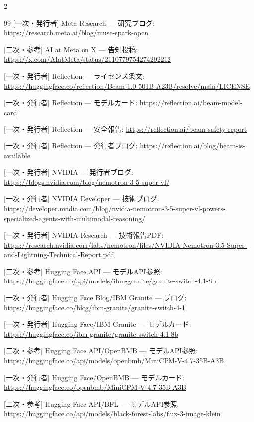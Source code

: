 \documentclass[lualatex,a4paper,10pt]{jlreq}
\begin{document}
\begin{multicols}{2}
\begin{thebibliography}{99}
 [一次・発行者] Meta Research — 研究ブログ: \url{https://research.meta.ai/blog/muse-spark-open}

 [二次・参考] AI at Meta on X — 告知投稿: \url{https://x.com/AIatMeta/status/2110779754274292212}

 [一次・発行者] Reflection — ライセンス条文: \url{https://huggingface.co/reflection/Beam-1.0-501B-A23B/resolve/main/LICENSE}

 [一次・発行者] Reflection — モデルカード: \url{https://reflection.ai/beam-model-card}

 [一次・発行者] Reflection — 安全報告: \url{https://reflection.ai/beam-safety-report}

 [一次・発行者] Reflection — 発行者ブログ: \url{https://reflection.ai/blog/beam-is-available}

 [一次・発行者] NVIDIA — 発行者ブログ: \url{https://blogs.nvidia.com/blog/nemotron-3-5-super-vl/}

 [一次・発行者] NVIDIA Developer — 技術ブログ: \url{https://developer.nvidia.com/blog/nvidia-nemotron-3-5-super-vl-powers-specialized-agents-with-multimodal-reasoning/}

 [一次・発行者] NVIDIA Research — 技術報告PDF: \url{https://research.nvidia.com/labs/nemotron/files/NVIDIA-Nemotron-3.5-Super-and-Lightning-Technical-Report.pdf}

 [二次・参考] Hugging Face API — モデルAPI参照: \url{https://huggingface.co/api/models/ibm-granite/granite-switch-4.1-8b}

 [一次・発行者] Hugging Face Blog/IBM Granite — ブログ: \url{https://huggingface.co/blog/ibm-granite/granite-switch-4-1}

 [一次・発行者] Hugging Face/IBM Granite — モデルカード: \url{https://huggingface.co/ibm-granite/granite-switch-4.1-8b}

 [二次・参考] Hugging Face API/OpenBMB — モデルAPI参照: \url{https://huggingface.co/api/models/openbmb/MiniCPM-V-4.7-35B-A3B}

 [一次・発行者] Hugging Face/OpenBMB — モデルカード: \url{https://huggingface.co/openbmb/MiniCPM-V-4.7-35B-A3B}

 [二次・参考] Hugging Face API/BFL — モデルAPI参照: \url{https://huggingface.co/api/models/black-forest-labs/flux-3-image-klein}


\end{thebibliography}
\end{multicols}
\end{document}
